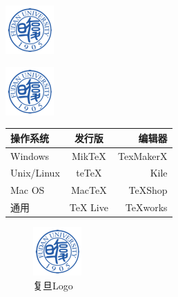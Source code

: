 \documentclass{article}
\begin{document}
\includegraphics{Fudan-Logo.png}	%

\includegraphics[width = .8\textwidth]{Fudan-Logo.png} %


\begin{tabular}{|l|c|r|}	 	%
 \hline   %
操作系统& 发行版& 编辑器\\		%
 \hline
Windows & MikTeX & TexMakerX \\
 \hline
Unix/Linux & teTeX & Kile \\
 \hline
Mac OS & MacTeX & TeXShop \\
 \hline
通用& TeX Live & TeXworks \\
 \hline
\end{tabular}

\begin{figure}[htbp]		%
\centering 				%
\includegraphics{Fudan-Logo.png}
\caption{复旦Logo}			%
\label{fig:myphoto}		%
\end{figure}
\end{document}
